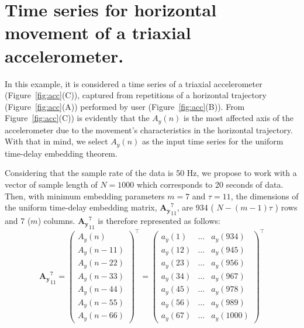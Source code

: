 \section{Time series for horizontal movement of a triaxial accelerometer.}
In this example, it is considered a time series of a triaxial accelerometer 
(Figure~\ref{fig:acc}(C)),
captured from repetitions of a horizontal trajectory (Figure~\ref{fig:acc}(A))
performed by user (Figure~\ref{fig:acc}(B)).
From Figure~\ref{fig:acc}(C)) is evidently that the $A_y(n)$ is 
the most affected axis of the accelerometer due to the movement's 
characteristics in the horizontal trajectory.
With that in mind, we select $A_y(n)$ as the input time series
for the uniform time-delay embedding theorem.

Considering that the sample rate of the data is 50 Hz, we propose to work
with a vector of sample length of $N=1000$ which corresponds to 20 seconds 
of data. Then, with minimum embedding parameters $m=7$ and $\tau=11$, 
the dimensions of the uniform time-delay embedding matrix, 
$\boldsymbol{{A_y}}^{7}_{11}$, are 934 ( $N-(m-1)\tau$ ) rows and 
7 ($m$) columns. 
$\boldsymbol{{A_y}}^{7}_{11}$ is therefore represented as follows:
\begin{equation} \label{eq:etde1_exampleA2}
\boldsymbol{{A_y}}^{7}_{11}  =
\begin{pmatrix}
  	{ A_y }(n) \\
  	{ A_y }(n-11) \\
	{ A_y }(n-22) \\
	{ A_y }(n-33) \\
	{ A_y }(n-44) \\
	{ A_y }(n-55) \\
  	{ A_y }(n-66) 
\end{pmatrix}^\intercal
=
\begin{pmatrix}
  	a_y(1)  & \dots & a_y(934) \\
  	a_y(12) & \dots & a_y(945) \\
  	a_y(23) & \dots & a_y(956) \\
  	a_y(34) & \dots & a_y(967) \\
  	a_y(45) & \dots & a_y(978) \\
  	a_y(56) & \dots & a_y(989) \\
  	a_y(67) & \dots & a_y(1000) 
\end{pmatrix}^\intercal   
\end{equation}


